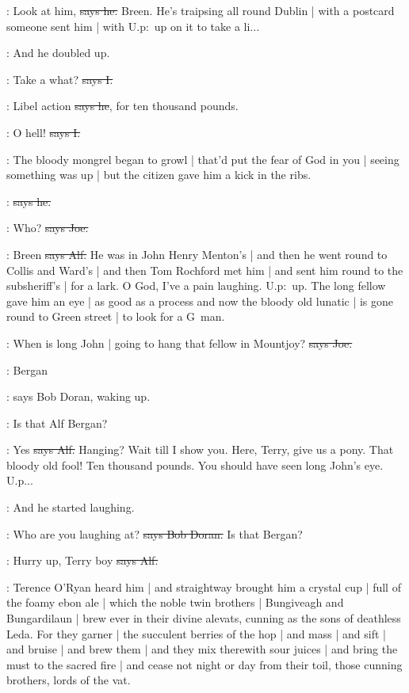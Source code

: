\bergan:
Look at him,
\sout{says he.}
Breen.
He's traipsing all round Dublin |
with a postcard someone sent him |
with U.p:~up
on it to take a li...

\Nq:
And he doubled up.

:
Take a what?
\sout{says I.}

\bergan:
Libel action
\sout{says he},
for ten thousand pounds.

:
O hell!
\sout{says I.}

\Nq:
The bloody mongrel began to growl |
that'd put the fear of God in you |
seeing something was up |
but the citizen gave him a kick in the ribs.

\citizen:
\sout{says he.}

\joe:
Who?
\sout{says Joe.}

\bergan:
Breen
\sout{says Alf.}
He was in John Henry Menton's |
and then he went round to Collis and Ward's |
and then Tom Rochford met him |
and sent him round to the subsheriff's |
for a lark.
O God,
I've a pain laughing.
U.p:~up.
The long fellow gave him an eye |
as good as a process
and now the bloody old lunatic |
is gone round to Green street |
to look for a G~man.

\joe:
When is long John |
going to hang that fellow in Mountjoy?
\sout{says Joe.}

\doran:
Bergan

\Nq:
says Bob Doran,
waking up.

\doran:
Is that Alf Bergan?

\bergan:
Yes
\sout{says Alf.}
Hanging?
Wait till I show you.
Here,
Terry,
give us a pony.
That bloody old fool!
Ten thousand pounds.
You should have seen long John's eye.
U.p...

\Nq:
And he started laughing.

\doran:
Who are you laughing at?
\sout{says Bob Doran.}
Is that Bergan?

\bergan:
Hurry up,
Terry boy
\sout{says Alf.}

:
Terence O'Ryan heard him |
and straightway brought him a crystal cup |
full of the foamy ebon ale |
which the noble twin brothers |
Bungiveagh and Bungardilaun |
brew ever in their divine alevats,
cunning as the sons of deathless Leda.
For they garner |
the succulent berries of the hop |
and mass |
and sift |
and bruise |
and brew them |
and they mix therewith sour juices |
and bring the must to the sacred fire |
and cease not night or day from their toil,
those cunning brothers,
lords of the vat.

